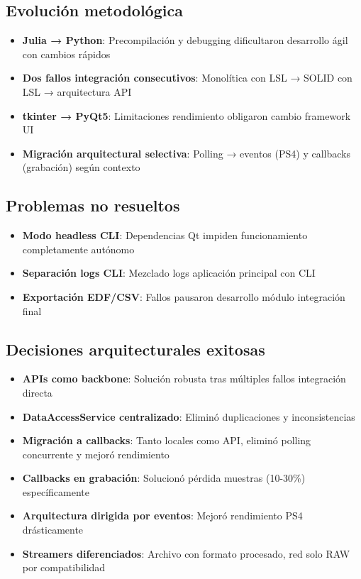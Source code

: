 \subsection{Evolución metodológica}
\begin{itemize}
    \item \textbf{Julia → Python}: Precompilación y debugging dificultaron desarrollo ágil con cambios rápidos
    \item \textbf{Dos fallos integración consecutivos}: Monolítica con LSL → SOLID con LSL → arquitectura API
    \item \textbf{tkinter → PyQt5}: Limitaciones rendimiento obligaron cambio framework UI
    \item \textbf{Migración arquitectural selectiva}: Polling → eventos (PS4) y callbacks (grabación) según contexto
\end{itemize}

\subsection{Problemas no resueltos}
\begin{itemize}
    \item \textbf{Modo headless CLI}: Dependencias Qt impiden funcionamiento completamente autónomo
    \item \textbf{Separación logs CLI}: Mezclado logs aplicación principal con CLI
    \item \textbf{Exportación EDF/CSV}: Fallos pausaron desarrollo módulo integración final
\end{itemize}

\subsection{Decisiones arquitecturales exitosas}
\begin{itemize}
    \item \textbf{APIs como backbone}: Solución robusta tras múltiples fallos integración directa
    \item \textbf{DataAccessService centralizado}: Eliminó duplicaciones y inconsistencias
    \item \textbf{Migración a callbacks}: Tanto locales como API, eliminó polling concurrente y mejoró rendimiento
    \item \textbf{Callbacks en grabación}: Solucionó pérdida muestras (10-30\%) específicamente
    \item \textbf{Arquitectura dirigida por eventos}: Mejoró rendimiento PS4 drásticamente
    \item \textbf{Streamers diferenciados}: Archivo con formato procesado, red solo RAW por compatibilidad
\end{itemize}

